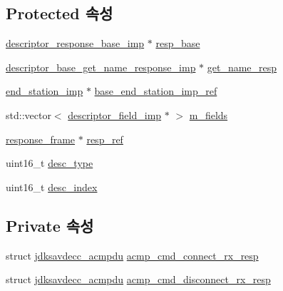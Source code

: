 \subsection*{Protected 속성}
\begin{DoxyCompactItemize}
\item 
\hyperlink{classavdecc__lib_1_1descriptor__response__base__imp}{descriptor\+\_\+response\+\_\+base\+\_\+imp} $\ast$ \hyperlink{classavdecc__lib_1_1descriptor__base__imp_a8b104da8319cda946944548ebb9552f4}{resp\+\_\+base}
\item 
\hyperlink{classavdecc__lib_1_1descriptor__base__get__name__response__imp}{descriptor\+\_\+base\+\_\+get\+\_\+name\+\_\+response\+\_\+imp} $\ast$ \hyperlink{classavdecc__lib_1_1descriptor__base__imp_a7d3a410eb242dc2b7abe9862a1593458}{get\+\_\+name\+\_\+resp}
\item 
\hyperlink{classavdecc__lib_1_1end__station__imp}{end\+\_\+station\+\_\+imp} $\ast$ \hyperlink{classavdecc__lib_1_1descriptor__base__imp_a550c969411f5f3b69f55cc139763d224}{base\+\_\+end\+\_\+station\+\_\+imp\+\_\+ref}
\item 
std\+::vector$<$ \hyperlink{classavdecc__lib_1_1descriptor__field__imp}{descriptor\+\_\+field\+\_\+imp} $\ast$ $>$ \hyperlink{classavdecc__lib_1_1descriptor__base__imp_adce67136eb9c66da9c189b730077b9cd}{m\+\_\+fields}
\item 
\hyperlink{classavdecc__lib_1_1response__frame}{response\+\_\+frame} $\ast$ \hyperlink{classavdecc__lib_1_1descriptor__base__imp_a2642e3a7c10d38553e7ff4a55e875346}{resp\+\_\+ref}
\item 
uint16\+\_\+t \hyperlink{classavdecc__lib_1_1descriptor__base__imp_a9dada313309522d04f1e52fe887442b4}{desc\+\_\+type}
\item 
uint16\+\_\+t \hyperlink{classavdecc__lib_1_1descriptor__base__imp_a2bbd0d8f32f687ca36aaa543c06f764c}{desc\+\_\+index}
\end{DoxyCompactItemize}
\subsection*{Private 속성}
\begin{DoxyCompactItemize}
\item 
struct \hyperlink{structjdksavdecc__acmpdu}{jdksavdecc\+\_\+acmpdu} \hyperlink{classavdecc__lib_1_1stream__input__descriptor__imp_a561a3829d1cc67d85b732a62cba7fcf0}{acmp\+\_\+cmd\+\_\+connect\+\_\+rx\+\_\+resp}
\item 
struct \hyperlink{structjdksavdecc__acmpdu}{jdksavdecc\+\_\+acmpdu} \hyperlink{classavdecc__lib_1_1stream__input__descriptor__imp_a7572bee02b8a263009be2803e63f1790}{acmp\+\_\+cmd\+\_\+disconnect\+\_\+rx\+\_\+resp}
\end{DoxyCompactItemize}


